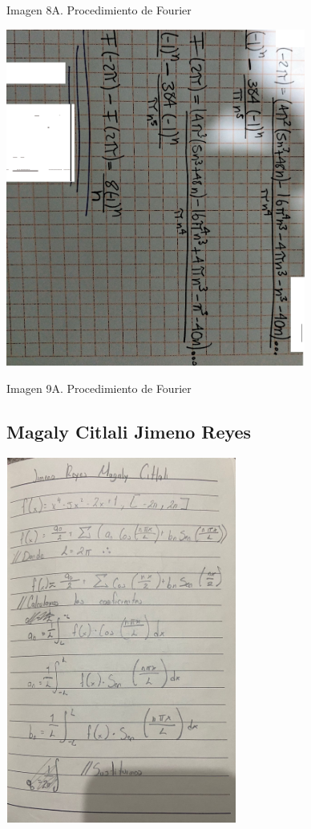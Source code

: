 Imagen 8A. Procedimiento de Fourier

\includegraphics[width=3.88021in,height=4.37099in]{media/image43.png}

Imagen 9A. Procedimiento de Fourier

\subsection{\texorpdfstring{Magaly Citlali Jimeno Reyes }{Magaly Citlali Jimeno Reyes }}\label{magaly-citlali-jimeno-reyes}

\includegraphics[width=2.98958in,height=4.74434in]{media/image13.jpg}

